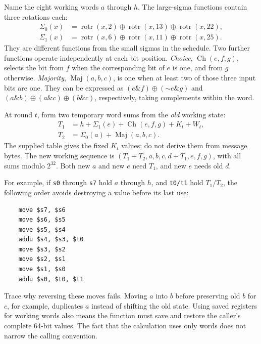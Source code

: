 Name the eight working words $a$ through $h$. The large-sigma functions contain
three rotations each:
\[
  \begin{aligned}
    \Sigma_0(x) & =\operatorname{rotr}(x,2)\mathbin{\oplus}
    \operatorname{rotr}(x,13)\mathbin{\oplus}\operatorname{rotr}(x,22), \\
    \Sigma_1(x) & =\operatorname{rotr}(x,6)\mathbin{\oplus}
    \operatorname{rotr}(x,11)\mathbin{\oplus}\operatorname{rotr}(x,25).
  \end{aligned}
\]
They are different functions from the small sigmas in the schedule.
Two further functions operate independently at each bit position.
\emph{Choice}, $\operatorname{Ch}(e,f,g)$, selects the bit from $f$ when the
corresponding bit of $e$ is one, and from $g$ otherwise. \emph{Majority},
$\operatorname{Maj}(a,b,c)$, is one when at least two of those three input bits
are one. They can be expressed as
$(e\mathbin{\&}f)\mathbin{\oplus}(\mathord{\sim}e\mathbin{\&}g)$ and
$(a\mathbin{\&}b)\mathbin{\oplus}(a\mathbin{\&}c)
  \mathbin{\oplus}(b\mathbin{\&}c)$, respectively, taking complements within
the word.

At round $t$, form two temporary word sums from the \emph{old} working state:
\[
  \begin{aligned}
    T_1 & =h+\Sigma_1(e)+\operatorname{Ch}(e,f,g)+K_t+W_t, \\
    T_2 & =\Sigma_0(a)+\operatorname{Maj}(a,b,c).
  \end{aligned}
\]
The supplied table gives the fixed $K_t$ values; do not derive them from message
bytes. The new working sequence is
$(T_1+T_2,a,b,c,d+T_1,e,f,g)$, with all sums modulo $2^{32}$.
Both new $a$ and new $e$ need $T_1$, and new $e$ needs old $d$.

For example, if \texttt{s0} through \texttt{s7} hold $a$ through $h$, and
\texttt{t0/t1} hold $T_1/T_2$, the following order avoids destroying a value
before its last use:

\begin{verbatim}
    move $s7, $s6
    move $s6, $s5
    move $s5, $s4
    addu $s4, $s3, $t0
    move $s3, $s2
    move $s2, $s1
    move $s1, $s0
    addu $s0, $t0, $t1
\end{verbatim}

Trace why reversing these moves fails. Moving $a$ into $b$ before preserving old
$b$ for $c$, for example, duplicates $a$ instead of shifting the old state.
Using saved registers for working words also means the function must save and
restore the caller's complete 64-bit values. The fact that the calculation uses
only words does not narrow the calling convention.

